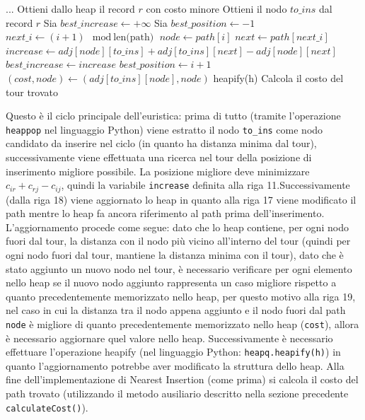 \documentclass[a4paper,12pt]{report}
\begin{document}
\begin{tcolorbox}[colframe=black, colback=white, boxrule=0.5pt, title=Nearest Insertion, coltitle=black, fonttitle=\bfseries, colbacktitle=white, breakable]
  \begin{algorithmic}[1]
    \State ...
      \State Ottieni dallo heap il record $r$ con costo minore
      \State Ottieni il nodo $to\_ins$ dal record $r$
      \State Sia $best\_increase \gets +\infty$
      \State Sia $best\_position \gets -1$
        \State $next\_i \gets (i + 1) \mod \text{len(path)}$
        \State $node \gets path[i]$
        \State $next \gets path[next\_i]$
        \State $increase \gets adj[node][to\_ins] + adj[to\_ins][next] - adj[node][next]$
          \State $best\_increase \gets increase$
          \State $best\_position \gets i + 1$
        \EndIf
      \EndFor
      \State {}
          \State $(cost, node) \gets (adj[to\_ins][node], node)$
        \EndIf
      \EndFor
      \State heapify(h)
    \EndWhile
    \State Calcola il costo del tour trovato
  \end{algorithmic}
  \end{tcolorbox}
Questo è il ciclo principale dell'euristica: prima di tutto (tramite l'operazione \lstinline!heappop! nel linguaggio Python) viene estratto il nodo \lstinline!to_ins! come nodo candidato da inserire nel ciclo (in quanto ha distanza minima dal tour), successivamente viene effettuata una ricerca nel tour della posizione di inserimento migliore possibile. La posizione migliore deve minimizzare $c_{ir} + c_{rj} - c_{ij}$, quindi la variabile \lstinline!increase! definita alla riga 11.\newline Successivamente (dalla riga 18) viene aggiornato lo heap in quanto alla riga 17 viene modificato il path mentre lo heap fa ancora riferimento al path prima dell'inserimento. L'aggiornamento procede come segue: dato che lo heap contiene, per ogni nodo fuori dal tour, la distanza con il nodo più vicino all'interno del tour (quindi per ogni nodo fuori dal tour, mantiene la distanza minima con il tour), dato che è stato aggiunto un nuovo nodo nel tour, è necessario verificare per ogni elemento nello heap se il nuovo nodo aggiunto rappresenta un caso migliore rispetto a quanto precedentemente memorizzato nello heap, per questo motivo alla riga 19, nel caso in cui la distanza tra il nodo appena aggiunto e il nodo fuori dal path \lstinline!node! è migliore di quanto precedentemente memorizzato nello heap (\lstinline!cost!), allora è necessario aggiornare quel valore nello heap. \newline Successivamente è necessario effettuare l'operazione heapify (nel linguaggio Python: \lstinline!heapq.heapify(h)!) in quanto l'aggiornamento potrebbe aver modificato la struttura dello heap. Alla fine dell'implementazione di Nearest Insertion (come prima) si calcola il costo del path trovato (utilizzando il metodo ausiliario descritto nella sezione precedente \lstinline!calculateCost()!). \newline
\end{document}
